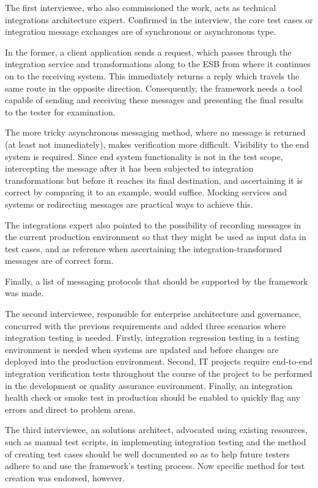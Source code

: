 \documentclass[12pt,a4paper,oneside,pdftex]{report}
\begin{document}
The first interviewee, who also commissioned the work, acts as technical integrations architecture expert. Confirmed in the interview, the core test cases or integration message exchanges are of synchronous or asynchronous type. 

In the former, a client application sends a request, which passes through the integration service and transformations along to the ESB from where it continues on to the receiving system. This immediately returns a reply which travels the same route in the opposite direction. Consequently, the framework needs a tool capable of sending and receiving these messages and presenting the final results to the tester for examination.

The more tricky asynchronous messaging method, where no message is returned (at least not immediately), makes verification more difficult. Visibility to the end system is required. Since end system functionality is not in the test scope, intercepting the message after it has been subjected to integration transformations but before it reaches its final destination, and ascertaining it is correct by comparing it to an example, would suffice. Mocking services and systems or redirecting messages are practical ways to achieve this.

The integrations expert also pointed to the possibility of recording messages in the current production environment so that they might be used as input data in test cases, and as reference when ascertaining the integration-transformed messages are of correct form. 

Finally, a list of messaging protocols that should be supported by the framework was made.

The second interviewee, responsible for enterprise architecture and governance, concurred with the previous requirements and added three scenarios where integration testing is needed. Firstly, integration regression testing in a testing environment is needed when systems are updated and before changes are deployed into the production environment. Second, IT projects require end-to-end integration verification tests throughout the course of the project to be performed in the development or quality assurance environment. Finally, an integration health check or smoke test in production should be enabled to quickly flag any errors and direct to problem areas. 

The third interviewee, an solutions architect, advocated using existing resources, such as manual test scripts, in implementing integration testing and the method of creating test cases should be well documented so as to help future testers adhere to and use the framework's testing process. Now specific method for test creation was endorsed, however.
\end{document}
